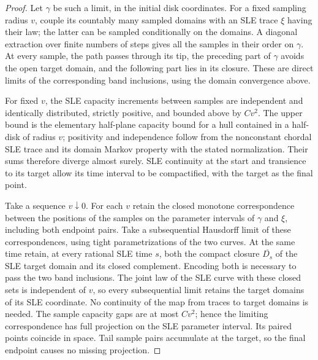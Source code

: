 \begin{proof}
Let $\gamma$ be such a limit, in the initial disk coordinates.
For a fixed sampling radius $v$, couple its countably many sampled
domains with an SLE trace $\xi$ having their law; the latter can
be sampled conditionally on the domains.  A diagonal extraction
over finite numbers of steps gives all the samples in their order
on $\gamma$.  At every sample, the path passes through its tip,
the preceding part of $\gamma$ avoids the open target domain,
and the following part lies in its closure.  These are direct
limits of the corresponding band inclusions, using the domain
convergence above.

For fixed $v$, the SLE capacity increments between samples are
independent and identically distributed, strictly positive, and
bounded above by $Cv^2$.  The upper bound is the elementary
half-plane capacity bound for a hull contained in a half-disk of
radius $v$; positivity and independence follow from the
nonconstant chordal SLE trace and its domain Markov property with
the stated normalization.  Their sums therefore diverge almost
surely.  SLE continuity at the start and transience to its target
allow its time interval to be compactified, with the target as
the final point.

Take a sequence $v\downarrow0$.  For each $v$ retain the closed
monotone correspondence between the positions of the samples
on the parameter intervals of $\gamma$ and $\xi$, including
both endpoint pairs.  Take a subsequential Hausdorff limit of
these correspondences, using tight parametrizations of the two
curves.  At the same time retain, at every rational SLE time
$s$, both the compact closure $\overline{D_s}$ of the SLE target
domain and its closed complement.  Encoding both is necessary
to pass the two band inclusions.  The joint law of the SLE curve
with these closed sets is independent of $v$, so every subsequential
limit retains the target domains of its SLE coordinate.  No continuity
of the map from traces to target domains is needed.  The sample capacity gaps are
at most $Cv^2$; hence the limiting correspondence has full
projection on the SLE parameter interval.  Its paired points
coincide in space.  Tail sample pairs accumulate at the target,
so the final endpoint causes no missing projection.


\end{proof}
